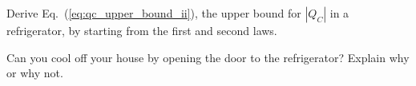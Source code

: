 
\begin{problem} 
  Derive Eq.~(\ref{eq:qc_upper_bound_ii}), the upper bound for $|Q_C|$
  in a refrigerator, by starting from the first and second laws.
\end{problem}

\begin{problem}
  Can you cool off your house by opening the door to the refrigerator?
  Explain why or why not.
\end{problem}



